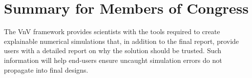 \section*{Summary for Members of Congress}
The VnV framework provides scientists with the tools required 
to create explainable numerical simulations that, in addition to the final report, provide
users with a detailed report on why the solution should be trusted. Such information will
help end-users ensure uncaught simulation errors do not propagate into final designs. 
